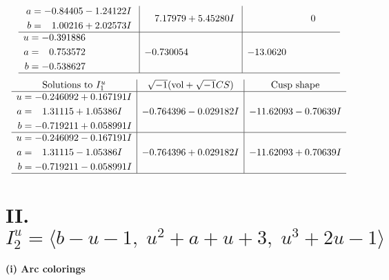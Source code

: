 \documentclass[1p]{elsarticle_modified}
\theoremstyle{definition}
\newcommand{\I}{\sqrt{-1}}
\begin{document}
$$\begin{array}{c|c|c}
\begin{aligned}
a &= -0.84405 - 1.24122 I \\
b &= \phantom{-}1.00216 + 2.02573 I\end{aligned}
 & \phantom{-}7.17979 + 5.45280 I & \phantom{-0.000000 } 0 \\ \hline\begin{aligned}
u &= -0.391886\phantom{ +0.000000I} \\
a &= \phantom{-}0.753572\phantom{ +0.000000I} \\
b &= -0.538627\phantom{ +0.000000I}\end{aligned}
 & -0.730054\phantom{ +0.000000I} & -13.0620\phantom{ +0.000000I}\\
 \hline 
 \end{array}$$\newpage$$\begin{array}{c|c|c}  
\text{Solutions to }I^u_{1}& \I (\text{vol} + \sqrt{-1}CS) & \text{Cusp shape}\\
 \hline 
\begin{aligned}
u &= -0.246092 + 0.167191 I \\
a &= \phantom{-}1.31115 + 1.05386 I \\
b &= -0.719211 + 0.058991 I\end{aligned}
 & -0.764396 - 0.029182 I & -11.62093 - 0.70639 I \\ \hline\begin{aligned}
u &= -0.246092 - 0.167191 I \\
a &= \phantom{-}1.31115 - 1.05386 I \\
b &= -0.719211 - 0.058991 I\end{aligned}
 & -0.764396 + 0.029182 I & -11.62093 + 0.70639 I\\
 \hline 
 \end{array}$$\newpage\newpage\renewcommand{\arraystretch}{1}
\centering \section*{II. $I^u_{2}= \langle b- u-1,\;u^2+a+u+3,\;u^3+2 u-1 \rangle$}
\flushleft \textbf{(i) Arc colorings}\\
\end{document}
